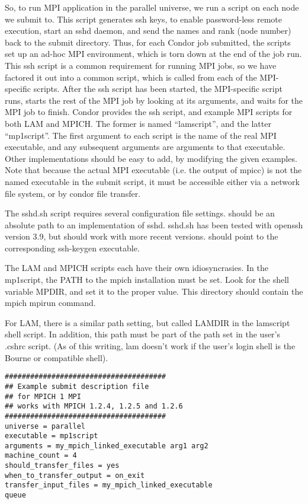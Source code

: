 So, to run MPI application in the parallel universe, we run a script
on each node we submit to.  This script generates ssh keys, to enable
password-less remote execution, start an sshd daemon, and send the
names and rank (node number) back to the submit directory.  Thus, for
each Condor job submitted, the scripts set up an ad-hoc MPI
environment, which is torn down at the end of the job run.  This ssh
script is a common requirement for running MPI jobs, so we have
factored it out into a common script, which is called from each of the
MPI-specific scripts.  After the ssh script has been started, the
MPI-specific script runs, starts the rest of the MPI job by looking at
its arguments, and waits for the MPI job to finish.  Condor provides
the ssh script, and example MPI scripts for both LAM and MPICH.  The
former is named ``lamscript'', and the latter ``mp1script''.  The
first argument to each script is the name of the real MPI executable,
and any subsequent arguments are arguments to that executable.  Other
implementations should be easy to add, by modifying the given
examples.  Note that because the actual MPI executable (i.e. the
output of mpicc) is not the named executable in the submit script, it
must be accessible either via a network file system, or by condor file
transfer.

The sshd.sh script requires several configuration file settings.
 should be an absolute path to an implementation of
sshd.  sshd.sh has been tested with openssh version 3.9, but should
work with more recent versions.   should
point to the corresponding ssh-keygen executable.

The LAM and MPICH scripts each have their own idiosyncrasies.  In the
mp1script, the PATH to the mpich installation must be set.  Look
for the shell variable MPDIR, and set it to the proper value.  This
directory should contain the mpich mpirun command.

For LAM, there is a similar path setting, but called LAMDIR in the
lamscript shell script.  In addition, this path must be part of the
path set in the user's .cshrc script.  (As of this writing, lam doesn't
work if the user's login shell is the Bourne or compatible shell).

\begin{verbatim}
######################################
## Example submit description file
## for MPICH 1 MPI
## works with MPICH 1.2.4, 1.2.5 and 1.2.6
######################################
universe = parallel
executable = mp1script
arguments = my_mpich_linked_executable arg1 arg2
machine_count = 4
should_transfer_files = yes
when_to_transfer_output = on_exit
transfer_input_files = my_mpich_linked_executable
queue
\end{verbatim}

